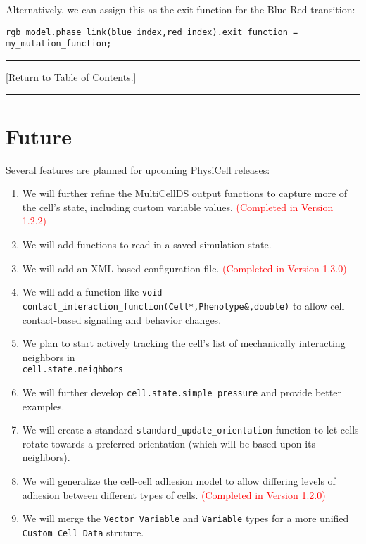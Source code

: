 \documentclass[12pt]{article}
\renewcommand{\v}{\verb}
\newcommand{\red}[1]{\textcolor{red}{#1}}
\newcommand{\TOClink}{\begin{center}\hrule\vskip-5pt\phantom{.}\hfill[Return to \hyperlink{TOC}{Table of Contents}.]\hfill\phantom{.}\vskip3pt\hrule\end{center}}
\begin{document}
Alternatively, we can assign this as the exit function for the Blue-Red transition: 
\begin{verbatim}
rgb_model.phase_link(blue_index,red_index).exit_function = my_mutation_function; 
\end{verbatim}
\TOClink 


\section{Future}
\label{sec:Future_Plans}
Several features are planned for upcoming PhysiCell releases: 
\begin{enumerate}
\item 
We will further refine the MultiCellDS output functions to capture 
more of the cell's state, including custom variable values. 
\red{(Completed in Version 1.2.2)}

\item 
We will add functions to read in a saved simulation state. 

\item 
We will add an XML-based configuration file. 
\red{(Completed in Version 1.3.0)}

\item 
We will add a function like 
\v|void contact_interaction_function(Cell*,Phenotype&,double)| 
to allow cell contact-based signaling and behavior changes. 

\item 
We plan to start actively tracking the cell's list of mechanically interacting neighbors in \\
\v|cell.state.neighbors|

\item 
We will further develop \v|cell.state.simple_pressure| and provide better examples. 

\item
We will create a standard \v|standard_update_orientation| function to 
let cells rotate towards a preferred orientation (which will be based upon 
its neighbors). 

\item 
We will generalize the cell-cell adhesion model to allow differing levels of adhesion 
between different types of cells. \red{(Completed in Version 1.2.0)} 

\item 
We will merge the \v|Vector_Variable| and \v|Variable| types for a more unified 
\v|Custom_Cell_Data| struture. 


\end{enumerate}
\end{document}
